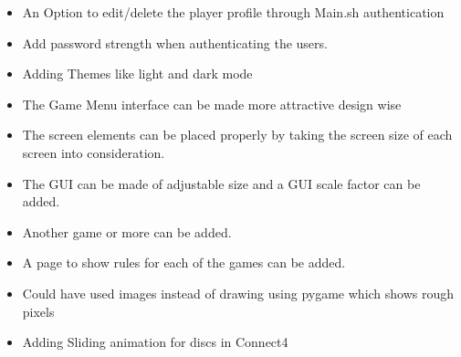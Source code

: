 \documentclass[12pt,a4paper]{article}
\begin{document}
\begin{itemize}
    \item An Option to edit/delete the player profile through Main.sh authentication
    \item Add password strength when authenticating the users.
    \item Adding Themes like light and dark mode
    \item The Game Menu interface can be made more attractive design wise
    \item The screen elements can be placed properly by taking the screen size of each screen into consideration.
    \item The GUI can be made of adjustable size and a GUI scale factor can be added.
    \item Another game or more can be added.
    \item A page to show rules for each of the games can be added.
    \item Could have used images instead of drawing using pygame which shows rough pixels
    \item Adding Sliding animation for discs in Connect4
\end{itemize}




\end{document}
